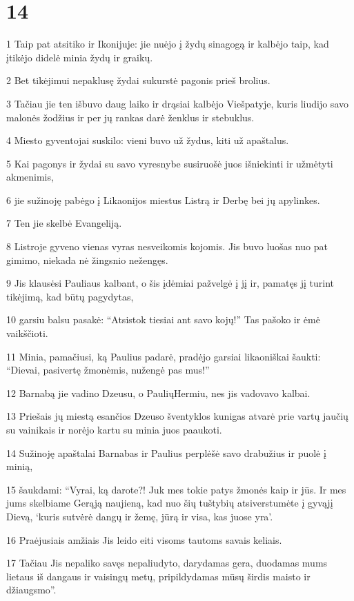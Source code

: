 \chapter{14}


\par 1 Taip pat atsitiko ir Ikonijuje: jie nuėjo į žydų sinagogą ir kalbėjo taip, kad įtikėjo didelė minia žydų ir graikų. 
\par 2 Bet tikėjimui nepaklusę žydai sukurstė pagonis prieš brolius. 
\par 3 Tačiau jie ten išbuvo daug laiko ir drąsiai kalbėjo Viešpatyje, kuris liudijo savo malonės žodžius ir per jų rankas darė ženklus ir stebuklus. 
\par 4 Miesto gyventojai suskilo: vieni buvo už žydus, kiti už apaštalus. 
\par 5 Kai pagonys ir žydai su savo vyresnybe susiruošė juos išniekinti ir užmėtyti akmenimis, 
\par 6 jie sužinoję pabėgo į Likaonijos miestus Listrą ir Derbę bei jų apylinkes. 
\par 7 Ten jie skelbė Evangeliją. 
\par 8 Listroje gyveno vienas vyras nesveikomis kojomis. Jis buvo luošas nuo pat gimimo, niekada nė žingsnio nežengęs. 
\par 9 Jis klausėsi Pauliaus kalbant, o šis įdėmiai pažvelgė į jį ir, pamatęs jį turint tikėjimą, kad būtų pagydytas, 
\par 10 garsiu balsu pasakė: “Atsistok tiesiai ant savo kojų!” Tas pašoko ir ėmė vaikščioti. 
\par 11 Minia, pamačiusi, ką Paulius padarė, pradėjo garsiai likaoniškai šaukti: “Dievai, pasivertę žmonėmis, nužengė pas mus!” 
\par 12 Barnabą jie vadino Dzeusu, o Paulių­Hermiu, nes jis vadovavo kalbai. 
\par 13 Priešais jų miestą esančios Dzeuso šventyklos kunigas atvarė prie vartų jaučių su vainikais ir norėjo kartu su minia juos paaukoti. 
\par 14 Sužinoję apaštalai Barnabas ir Paulius perplėšė savo drabužius ir puolė į minią, 
\par 15 šaukdami: “Vyrai, ką darote?! Juk mes tokie patys žmonės kaip ir jūs. Ir mes jums skelbiame Gerąją naujieną, kad nuo šių tuštybių atsiverstumėte į gyvąjį Dievą, ‘kuris sutvėrė dangų ir žemę, jūrą ir visa, kas juose yra’. 
\par 16 Praėjusiais amžiais Jis leido eiti visoms tautoms savais keliais. 
\par 17 Tačiau Jis nepaliko savęs nepaliudyto, darydamas gera, duodamas mums lietaus iš dangaus ir vaisingų metų, pripildydamas mūsų širdis maisto ir džiaugsmo”. 
